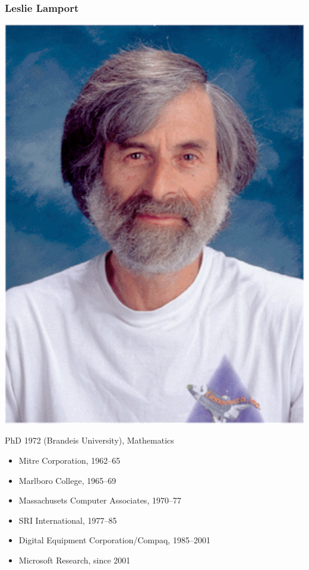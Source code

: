 \begin{frame}
  \frametitle{Leslie Lamport}

  \begin{minipage}{0.3\linewidth}
    \includegraphics[width=\linewidth]{figs/leslie}
  \end{minipage}
  \hfill
  \begin{minipage}{.6\linewidth}
    \raggedright
    \begin{small}
      PhD 1972 (Brandeis University), Mathematics

      \begin{itemize}
      \item Mitre Corporation, 1962--65
      \item Marlboro College, 1965--69
      \item Massachusets Computer Associates, 1970--77
      \item SRI International, 1977--85
      \item Digital Equipment Corporation/Compaq, 1985--2001
      \item Microsoft Research, since 2001
      \end{itemize}
    \end{small}
  \end{minipage}


\end{frame}
